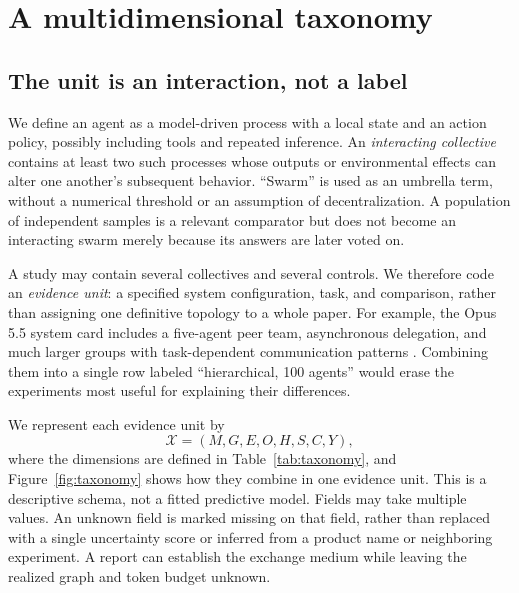 \section{A multidimensional taxonomy}
\label{sec:taxonomy}
\subsection{The unit is an interaction, not a label}
We define an agent as a model-driven process with a local state and an action policy, possibly including tools and repeated inference. An \emph{interacting collective} contains at least two such processes whose outputs or environmental effects can alter one another's subsequent behavior. ``Swarm'' is used as an umbrella term, without a numerical threshold or an assumption of decentralization. A population of independent samples is a relevant comparator but does not become an interacting swarm merely because its answers are later voted on.

A study may contain several collectives and several controls. We therefore code an \emph{evidence unit}: a specified system configuration, task, and comparison, rather than assigning one definitive topology to a whole paper. For example, the Opus 5.5 system card includes a five-agent peer team, asynchronous delegation, and much larger groups with task-dependent communication patterns \citep{opus55-card}. Combining them into a single row labeled ``hierarchical, 100 agents'' would erase the experiments most useful for explaining their differences.

We represent each evidence unit by
\begin{equation}
\mathcal{X}=(M,G,E,O,H,S,C,Y),
\end{equation}
where the dimensions are defined in Table~\ref{tab:taxonomy}, and Figure~\ref{fig:taxonomy} shows how they combine in one evidence unit. This is a descriptive schema, not a fitted predictive model. Fields may take multiple values. An unknown field is marked missing on that field, rather than replaced with a single uncertainty score or inferred from a product name or neighboring experiment. A report can establish the exchange medium while leaving the realized graph and token budget unknown.

